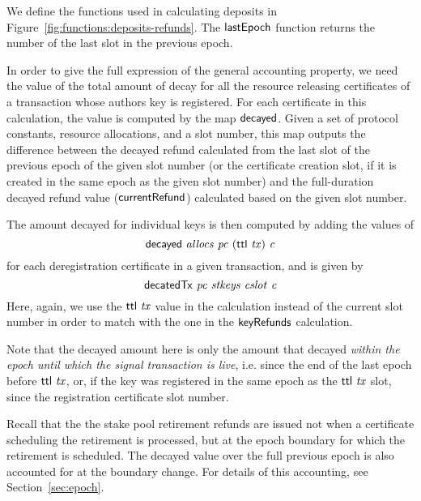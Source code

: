 \documentclass[11pt,a4paper,dvipsnames]{article}
\theoremstyle{definition}
\theoremstyle{definition}
\begin{document}
We define the functions used in calculating deposits in
Figure~\ref{fig:functions:deposits-refunds}.
The $\mathsf{lastEpoch}$ function
returns the number of the last slot in the previous epoch.

In order to give the full expression of the general accounting property,
we need the value of the total amount of decay for all the resource releasing
certificates of a transaction whose authors key is registered. For each
certificate in this calculation, the value is computed by the map $\mathsf{decayed}$.
Given a set of protocol constants, resource allocations, and a slot
number, this map outputs the difference between the decayed refund calculated from
the last slot of the previous epoch of the given slot number
(or the certificate creation slot, if it is created in the same epoch as the
given slot number) and the
full-duration decayed refund value ($\mathsf{currentRefund}$) calculated based on
the given slot number.

The amount decayed for individual keys is then computed by adding the values of
$$\mathsf{decayed}~\mathit{allocs}~\mathit{pc}~(\mathsf{ttl}~\mathit{tx})~\mathit{c}$$
for each deregistration certificate in a given transaction, and is given by
$$\mathsf{decatedTx}~\mathit{pc}~\mathit{stkeys}~\mathit{cslot}~\mathit{c}$$
Here, again, we use the $\mathsf{ttl}~\mathit{tx}$ value in the calculation instead of the current
slot number in order to match with the one in the $\mathsf{keyRefunds}$
calculation.

Note that the decayed amount here is only the amount that decayed \textit{within
the epoch until which the signal transaction is live}, i.e. since the end of the
last epoch before $\mathsf{ttl}~\mathit{tx}$, or, if the key was
registered in the same epoch as the $\mathsf{ttl}~\mathit{tx}$ slot,
since the registration certificate slot number.

Recall that the the stake pool retirement refunds are issued not when a certificate
scheduling the retirement is processed, but at the epoch boundary for which
the retirement is scheduled. The decayed value over the full previous epoch is
also accounted for at the boundary change. For details of this accounting, see
Section~\cref{sec:epoch}.
\end{document}
